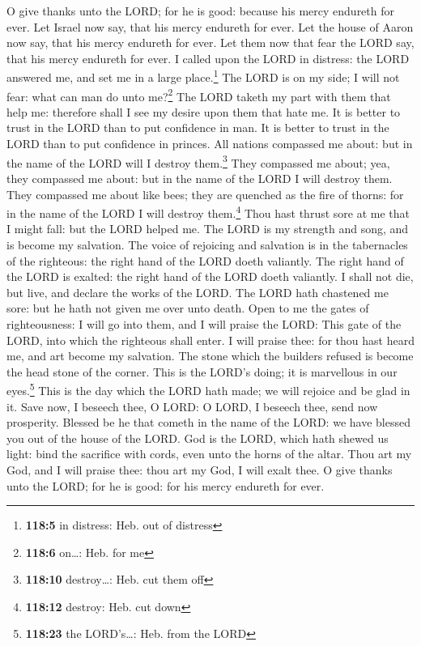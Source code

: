  O give thanks unto the LORD; for he is good: because his
mercy endureth for ever.  Let Israel now say, that his
mercy endureth for ever.  Let the house of Aaron now say,
that his mercy endureth for ever.  Let them now that fear
the LORD say, that his mercy endureth for ever.  I called
upon the LORD in distress: the LORD answered me, and set me in a large
place.\footnote{\textbf{118:5} in distress: Heb. out of distress}
 The LORD is on my side; I will not fear: what can man do
unto me?\footnote{\textbf{118:6} on\ldots: Heb. for me} 
The LORD taketh my part with them that help me: therefore shall I see my
desire upon them that hate me.  It is better to trust in
the LORD than to put confidence in man.  It is better to
trust in the LORD than to put confidence in princes.  All
nations compassed me about: but in the name of the LORD will I destroy
them.\footnote{\textbf{118:10} destroy\ldots: Heb. cut them off}
 They compassed me about; yea, they compassed me about:
but in the name of the LORD I will destroy them.  They
compassed me about like bees; they are quenched as the fire of thorns:
for in the name of the LORD I will destroy them.\footnote{\textbf{118:12}
  destroy: Heb. cut down}  Thou hast thrust sore at me
that I might fall: but the LORD helped me.  The LORD is
my strength and song, and is become my salvation.  The
voice of rejoicing and salvation is in the tabernacles of the righteous:
the right hand of the LORD doeth valiantly.  The right
hand of the LORD is exalted: the right hand of the LORD doeth valiantly.
 I shall not die, but live, and declare the works of the
LORD.  The LORD hath chastened me sore: but he hath not
given me over unto death.  Open to me the gates of
righteousness: I will go into them, and I will praise the LORD:
 This gate of the LORD, into which the righteous shall
enter.  I will praise thee: for thou hast heard me, and
art become my salvation.  The stone which the builders
refused is become the head stone of the corner.  This is
the LORD's doing; it is marvellous in our eyes.\footnote{\textbf{118:23}
  the LORD's\ldots: Heb. from the LORD}  This is the day
which the LORD hath made; we will rejoice and be glad in it.
 Save now, I beseech thee, O LORD: O LORD, I beseech
thee, send now prosperity.  Blessed be he that cometh in
the name of the LORD: we have blessed you out of the house of the LORD.
 God is the LORD, which hath shewed us light: bind the
sacrifice with cords, even unto the horns of the altar. 
Thou art my God, and I will praise thee: thou art my God, I will exalt
thee.  O give thanks unto the LORD; for he is good: for
his mercy endureth for ever.


